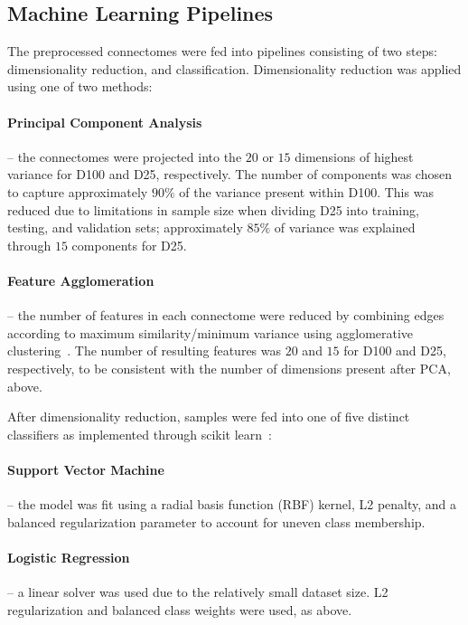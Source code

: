 \documentclass[fleqn,10pt]{SelfArx} %
\begin{document}
\subsection*{Machine Learning Pipelines}

The preprocessed connectomes were fed into pipelines consisting of two steps: dimensionality reduction, and
classification. Dimensionality reduction was applied using one of two methods:

\paragraph{Principal Component Analysis} – the connectomes were projected into the $20$ or $15$ dimensions of highest
variance for D100 and D25, respectively. The number of components was chosen to capture approximately $90\%$ of the
variance present within D100. This was reduced due to limitations in sample size when dividing D25 into training,
testing, and validation sets; approximately $85\%$ of variance was explained through $15$ components for D25.

\paragraph{Feature Agglomeration} – the number of features in each connectome were reduced by combining edges according
to maximum similarity/minimum variance using agglomerative clustering~\cite{Ward1963-uh}. The number of resulting
features was $20$ and $15$ for D100 and D25, respectively, to be consistent with the number of dimensions present after
PCA, above.

After dimensionality reduction, samples were fed into one of five distinct classifiers as implemented through scikit
learn~\cite{Pedregosa2011-uz}:

\paragraph{Support Vector Machine} – the model was fit using a radial basis function (RBF) kernel, L2 penalty, and a
balanced regularization parameter to account for uneven class membership.

\paragraph{Logistic Regression} – a linear solver was used due to the relatively small dataset size. L2 regularization
and balanced class weights were used, as above.
\end{document}
